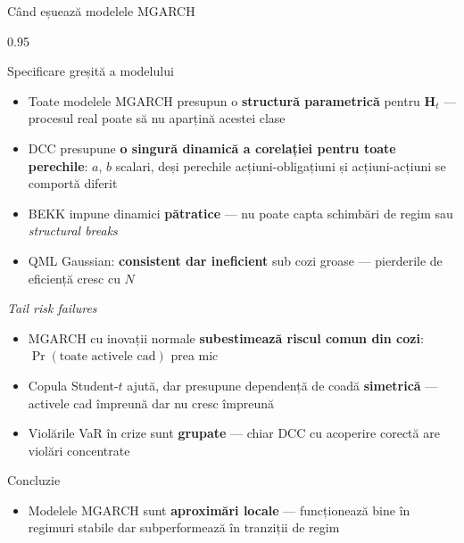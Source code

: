 \documentclass[9pt, aspectratio=169, t]{beamer}
\begin{document}
\begin{frame}{Când eșuează modelele MGARCH}
    \begin{cminipage}{0.95\textwidth}
    \vspace{-3mm}
    {\scriptsize
    \begin{block}{Specificare greșită a modelului}
        \begin{itemize}\setlength{\itemsep}{0pt}
            \item Toate modelele MGARCH presupun o \textbf{structură parametrică} pentru $\mathbf{H}_t$ --- procesul real poate să nu aparțină acestei clase
            \item DCC presupune \textbf{o singură dinamică a corelației pentru toate perechile}: $a$, $b$ scalari, deși perechile acțiuni-obligațiuni și acțiuni-acțiuni se comportă diferit
            \item BEKK impune dinamici \textbf{pătratice} --- nu poate capta schimbări de regim sau \textit{structural breaks}
            \item QML Gaussian: \textbf{consistent dar ineficient} sub cozi groase --- pierderile de eficiență cresc cu $N$
        \end{itemize}
    \end{block}
    \vspace{-2mm}
    \begin{block}{\textit{Tail risk failures}}
        \begin{itemize}\setlength{\itemsep}{0pt}
            \item MGARCH cu inovații normale \textbf{subestimează riscul comun din cozi}: $\Pr(\text{toate activele cad})$ prea mic
            \item Copula Student-$t$ ajută, dar presupune dependență de coadă \textbf{simetrică} --- activele cad împreună dar nu cresc împreună
            \item Violările VaR în crize sunt \textbf{grupate} --- chiar DCC cu acoperire corectă are violări concentrate
        \end{itemize}
    \end{block}
    \vspace{-2mm}
    \begin{alertblock}{Concluzie}
        \begin{itemize}\setlength{\itemsep}{0pt}
            \item Modelele MGARCH sunt \textbf{aproximări locale} --- funcționează bine în regimuri stabile dar subperformează în tranziții de regim
        \end{itemize}
    \end{alertblock}
    }
    \end{cminipage}
\end{frame}
\end{document}
